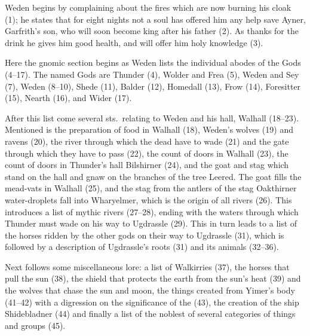 Weden begins by complaining about the fires which are now burning his cloak (1); he states that for eight nights not a soul has offered him any help save Ayner, Garfrith’s son, who will soon become king after his father (2).  As thanks for the drink he gives him good health, and will offer him holy knowledge (3).

Here the gnomic section begins as Weden lists the individual abodes of the Gods (4--17).  The named Gods are Thunder (4), Wolder and Frea (5), Weden and Sey (7), Weden (8--10), Shede (11), Balder (12), Homedall (13), Frow (14), Foresitter (15), Nearth (16), and Wider (17).


After this list come several sts.~relating to Weden and his hall, Walhall (18--23).  Mentioned is the preparation of food in Walhall (18), Weden’s wolves (19) and ravens (20), the river through which the dead have to wade (21) and the gate through which they have to pass (22), the count of doors in Walhall (23), the count of doors in Thunder’s hall Bilshirner (24), and the goat and stag which stand on the hall and gnaw on the branches of the tree Leered.  The goat fills the mead-vats in Walhall (25), and the stag from the antlers of the stag Oakthirner water-droplets fall into Wharyelmer, which is the origin of all rivers (26).
This introduces a list of mythic rivers (27--28), ending with the waters through which Thunder must wade on his way to Ugdrassle (29).  This in turn leads to a list of the horses ridden by the other gods on their way to Ugdrassle (31), which is followed by a description of Ugdrassle’s roots (31) and its animals (32--36).

Next follows some miscellaneous lore: a list of Walkirries (37), the horses that pull the sun (38), the shield that protects the earth from the sun’s heat (39) and the wolves that chase the sun and moon, the things created from Yimer’s body (41--42) with a digression on the significance of the  (43), the creation of the ship Shidebladner (44) and finally a list of the noblest of several categories of things and groups (45).

